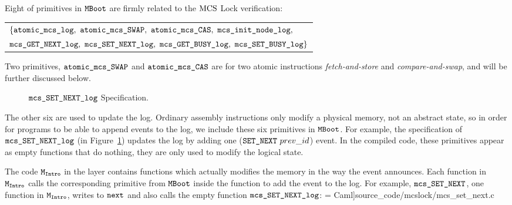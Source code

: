 Eight of  primitives in ${\mathrm{\texttt{MBoot}}}$  are firmly related to the $\mathrm{MCS}$ Lock verification:

\begin{center}
\begin{tabular}{P{0.95\textwidth}}
$\{\atomicmcslog,\  \atomicmcsswap,\ \atomicmcscas,\ \mcsinitnodelog,$\\
$\mcsgetnextlog,\ \mcssetnextlog,\ \mcsgetbusylog,\ \mcssetbusylog\} $\\
\end{tabular}
\end{center}

Two primitives, ${\mathrm{\texttt{atomic\_mcs\_SWAP}}}$ and ${\mathrm{\texttt{atomic\_mcs\_CAS}}}$ are for  two atomic instructions {\em fetch-and-store} and {\em compare-and-swap}, and will be further discussed below.

\begin{figure}
\begin{center}
 
\end{center}
\caption{${\mathrm{\texttt{mcs\_SET\_NEXT\_log}}}$ Specification.}
\label{fig:chapter:mcslock:specification-of-mcssetnextlog}
\end{figure}

The other six are used to update the log.  
Ordinary assembly instructions only modify a physical memory, not
an abstract state, so in order for programs to be able to append events to
the log, we include these six primitives in ${\mathrm{\texttt{MBoot}}}$. 
For example, the specification of ${\mathrm{\texttt{mcs\_SET\_NEXT\_log}}}$ (in Figure~\ref{fig:chapter:mcslock:specification-of-mcssetnextlog})
updates the log by adding one (${\mathrm{\texttt{SET\_NEXT}}}~{prev\_id}$) event.
In the compiled code, these primitives appear as empty functions that do nothing, they are only used to modify the logical state.

The code ${\mathrm{\texttt{M}}}_{{\mathrm{\texttt{Intro}}}}$ in the layer contains  
functions which actually modifies the memory in the way the event announces.
Each function in ${\mathrm{\texttt{M}}}_{{\mathrm{\texttt{Intro}}}}$ calls the corresponding primitive from
${\mathrm{\texttt{MBoot}}}$ inside the function to add the event to the log.
For example, ${\mathrm{\texttt{mcs\_SET\_NEXT}}}$, one function in ${\mathrm{\texttt{M}}}_{{\mathrm{\texttt{Intro}}}}$, writes
to ${\mathrm{\texttt{next}}}$ and also calls
the empty function ${\mathrm{\texttt{mcs\_SET\_NEXT\_log}}}$:
 = Caml]{source_code/mcslock/mcs_set_next.c}


